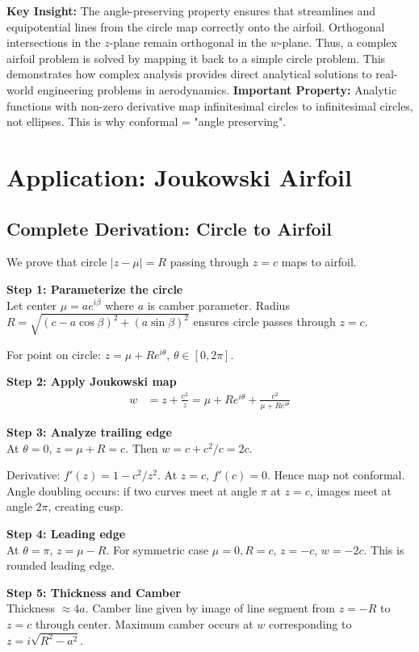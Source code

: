 \documentclass[12pt,a4paper]{article}
\begin{document}
\textbf{Key Insight:} The angle-preserving property ensures that streamlines and equipotential lines from the circle map correctly onto the airfoil. Orthogonal intersections in the $z$-plane remain orthogonal in the $w$-plane. Thus, a complex airfoil problem is solved by mapping it back to a simple circle problem. This demonstrates how complex analysis provides direct analytical solutions to real-world engineering problems in aerodynamics.
\textbf{Important Property:} Analytic functions with non-zero derivative map infinitesimal circles to infinitesimal circles, not ellipses. This is why conformal = "angle preserving".

\section{Application: Joukowski Airfoil}
\subsection{Complete Derivation: Circle to Airfoil}
We prove that circle $|z - \mu| = R$ passing through $z=c$ maps to airfoil.

\textbf{Step 1: Parameterize the circle} \\
Let center $\mu = ae^{i\beta}$ where $a$ is camber parameter. Radius $R = \sqrt{(c-a\cos\beta)^2 + (a\sin\beta)^2}$ ensures circle passes through $z=c$.

For point on circle: $z = \mu + Re^{i\theta}$, $\theta \in [0, 2\pi]$.

\textbf{Step 2: Apply Joukowski map} \\
\begin{align}
w &= z + \frac{c^2}{z} = \mu + Re^{i\theta} + \frac{c^2}{\mu + Re^{i\theta}}
\end{align}

\textbf{Step 3: Analyze trailing edge} \\
At $\theta = 0$, $z = \mu + R = c$. Then $w = c + c^2/c = 2c$. 

Derivative: $f'(z) = 1 - c^2/z^2$. At $z=c$, $f'(c) = 0$. Hence map not conformal. Angle doubling occurs: if two curves meet at angle $\pi$ at $z=c$, images meet at angle $2\pi$, creating cusp.

\textbf{Step 4: Leading edge} \\
At $\theta = \pi$, $z = \mu - R$. For symmetric case $\mu=0, R=c$, $z=-c$, $w = -2c$. This is rounded leading edge.

\textbf{Step 5: Thickness and Camber} \\
Thickness $\approx 4a$. Camber line given by image of line segment from $z=-R$ to $z=c$ through center. Maximum camber occurs at $w$ corresponding to $z = i\sqrt{R^2-a^2}$.
\end{document}
